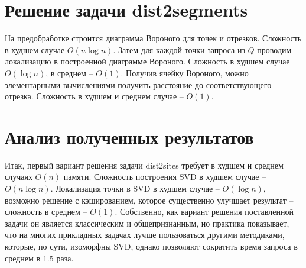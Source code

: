 \section{Решение задачи dist2segments}

На предобработке строится диаграмма Вороного для точек и отрезков.
Сложность в худшем случае $O(n \log n)$. Затем для каждой точки-запроса из $Q$
проводим локализацию в построенной диаграмме Вороного. Сложность в
худшем случае $O(\log n)$, в среднем -- $O(1)$. Получив ячейку Вороного, можно
элементарными вычислениями получить расстояние до соответствующего
отрезка. Сложность в худшем и среднем случае -- $O(1)$.

\section{Анализ полученных результатов}

Итак, первый вариант решения задачи dist2sites требует в худшем и
среднем случаях $O(n)$ памяти. Сложность построения SVD в худшем случае --
$O(n \log n)$. Локализация точки в SVD в худшем случае -- $O(\log n)$, возможно
решение с кэшированием, которое существенно улучшает результат --
сложность в среднем -- $O(1)$. Собственно, как вариант решения поставленной
задачи он является классическим и общепризнанным, но практика показывает,
что на многих прикладных задачах лучше пользоваться другими методиками,
которые, по сути, изоморфны SVD, однако позволяют сократить время запроса
в среднем в 1.5 раза.
